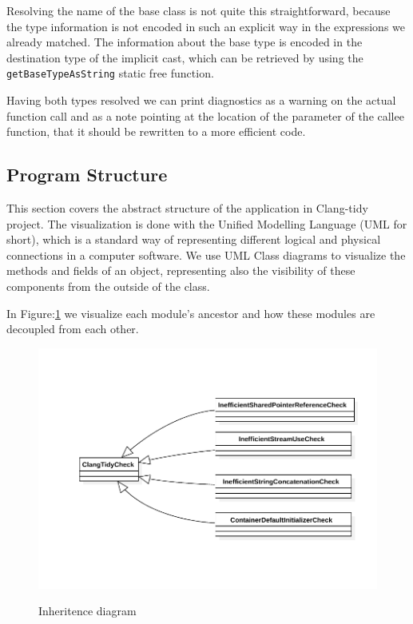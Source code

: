 \par Resolving the name of the base class is not quite this straightforward, because the type information is not encoded in such an explicit way in the expressions we already matched. The information about the base type is encoded in the destination type of the implicit cast, which can be retrieved by using the \verb|getBaseTypeAsString| static free function. \medskip 
\par Having both types resolved we can print diagnostics as a warning on the actual function call and as a note pointing at the location of the parameter of the callee function, that it should be rewritten to a more efficient code.
\subsection{Program Structure}
\par This section covers the abstract structure of the application in Clang-tidy project. The visualization is done with the Unified Modelling Language (UML for short), which is a standard way of representing different logical and physical connections in a computer software. We use UML Class diagrams to visualize the methods and fields of an object, representing also the visibility of these components from the outside of the class.  \medskip
\par In Figure:\ref{inheritence} we visualize each module's ancestor and how these modules are decoupled from each other.  
\begin{figure}[H]
 	\caption{Inheritence diagram}
 	\includegraphics[scale=1]{images/inheritence.pdf}
 	\label{inheritence}
\end{figure}
